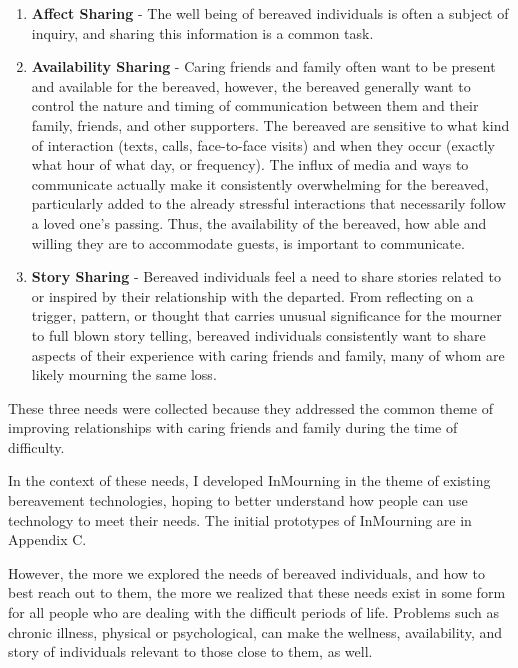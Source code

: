   \begin{enumerate}
  \item \textbf{Affect Sharing} - The well being of bereaved individuals is often a subject
    of inquiry, and sharing this information is a common task.
  \item \textbf{Availability Sharing} -
    Caring friends and family often want to be present
    and available for the bereaved, however,
    the bereaved generally want to control the nature and timing of communication between
    them and their family, friends, and other supporters.
    The bereaved are sensitive to what kind
    of interaction (texts, calls, face-to-face visits) and when they occur (exactly
    what hour of what day, or frequency). The influx of media and ways to
    communicate actually make it consistently overwhelming for the bereaved,
    particularly added to the already stressful interactions that necessarily
    follow a loved one's passing.
    Thus, the availability of the bereaved, how able and willing they are
    to accommodate guests, is important to communicate.
  \item \textbf{Story Sharing} - Bereaved individuals feel a need to share stories related to
    or inspired by their relationship with the departed.
    From reflecting on a trigger, pattern, or thought that carries unusual
    significance for the mourner to full blown story telling, bereaved individuals
    consistently want to share aspects of their experience with caring friends and
    family, many of whom are likely mourning the same loss.
  \end{enumerate}

  These three needs were collected because they addressed the common theme of improving
  relationships with caring friends and family during the time of difficulty.

  In the context of these needs, I developed InMourning
  in the theme of existing bereavement technologies,
  hoping to better understand how people can use technology to meet their needs.
  The initial prototypes of InMourning are in Appendix C.

  However, the more we explored the needs of bereaved individuals,
  and how to best reach out to them, the more we realized that these needs exist in some form
  for all people who are dealing with the difficult periods of life.
  Problems such as chronic illness, physical or psychological,
  can make the wellness, availability, and story of individuals relevant to those
  close to them, as well.
